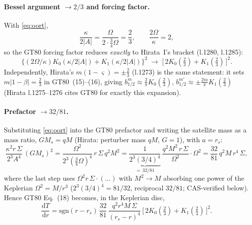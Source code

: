 \documentclass{article}
\newcommand{\rmd}{\mathrm d}
\begin{document}
\paragraph{Bessel argument $\to 2/3$ and forcing factor.} With \eqref{eq:oort},
\begin{equation}
\frac{\kappa}{2|A|}=\frac{\Omega}{2\cdot\tfrac34\Omega}=\frac23,
\qquad
\frac{2\Omega}{\kappa}=2,
\end{equation}
so the GT80 forcing factor reduces \emph{exactly} to Hirata~I's bracket (l.1280, l.1285):
\begin{equation}
\bigl\{(2\Omega/\kappa)K_0(\kappa/2|A|)+K_1(\kappa/2|A|)\bigr\}^2
 \;\longrightarrow\;
 \bigl[\,2K_0(\tfrac23)+K_1(\tfrac23)\,\bigr]^2 .
\end{equation}
Independently, Hirata's $m(1-\varsigma)=\pm\tfrac23$ (l.1273) is the same statement: it sets
$m|1-\beta|=\tfrac23$ in GT80~(15)--(16), giving $b_{1/2}^{m}\approx\tfrac2\pi K_0(\tfrac23)$,
$b_{1/2}^{m\prime}\approx\pm\tfrac{2m}\pi K_1(\tfrac23)$ (Hirata l.1275--1276 cites GT80 for exactly
this expansion).

\paragraph{Prefactor $\to 32/81$.} Substituting \eqref{eq:oort} into the GT80 prefactor and writing
the satellite mass as a mass ratio, $GM_s=qM$ (Hirata: perturber mass $qM$, $G=1$), with $a=r_s$:
\begin{equation}
\frac{\kappa^2 r\,\Sigma}{2^3 A^4}\,(GM_s)^2
 = \frac{\Omega^2}{2^3(\tfrac34\Omega)^4}\,r\,\Sigma\,q^2M^2
 = \underbrace{\frac{1}{2^3(3/4)^4}}_{=\,32/81}\,\frac{q^2 M^2\,r\,\Sigma}{\Omega^2}\cdot\Omega^2
 = \frac{32}{81}\,q^2 M\,r^4\,\Sigma ,
\end{equation}
where the last step uses $\Omega^2 r\,\Sigma\cdot(\dots)$ with $M^2\to M$ absorbing one power of the
Keplerian $\Omega^2=M/r^3$ ($2^3(3/4)^4=81/32$, reciprocal $32/81$; CAS-verified below). Hence GT80
Eq.~(18) becomes, in the Keplerian disc,
\begin{equation}
\frac{\rmd T}{\rmd r}
 = \mathrm{sgn}(r-r_s)\,\frac{32}{81}\,\frac{q^2 r^4 M\,\Sigma}{(r_s-r)^4}\,
   \bigl[\,2K_0(\tfrac23)+K_1(\tfrac23)\,\bigr]^2 .
\label{eq:GTkep}
\end{equation}
\end{document}
